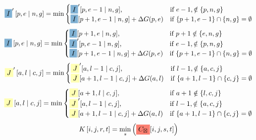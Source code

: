 \documentclass{article}
\begin{document}
$$ \colorbox{c4}{$I$}' \left[p,e \mid  n,g \right] =  \min\begin{cases}\colorbox{c4}{$I$}'[ p , e-1\mid n,g ], &\text{if } e-1 ,\notin\{ p , n,g \} \\\colorbox{c4}{$I$}[ p+1 , e-1\mid n,g ]+\Delta G(p,e) &\text{if } \{ p+1 , e-1 \}\cap \{ n,g \}=\emptyset\end{cases}$$
$$ \colorbox{c4}{$I$} \left[p,e \mid  n,g \right] =  \min\begin{cases}\colorbox{c4}{$I$}[ p+1 , e\mid n,g ], &\text{if } p+1 \notin\{ e , n,g \} \\\colorbox{c4}{$I$}'[ p , e-1\mid n,g ], &\text{if } e-1 ,\notin\{ p , n,g \} \\\colorbox{c4}{$I$}[ p+1 , e-1\mid n,g ]+\Delta G(p,e) &\text{if } \{ p+1 , e-1 \}\cap \{ n,g \}=\emptyset\end{cases}$$
$$ \colorbox{c1}{$J$}' \left[a,l \mid  c,j \right] =  \min\begin{cases}\colorbox{c1}{$J$}'[ a , l-1\mid c,j ], &\text{if } l-1 ,\notin\{ a , c,j \} \\\colorbox{c1}{$J$}[ a+1 , l-1\mid c,j ]+\Delta G(a,l) &\text{if } \{ a+1 , l-1 \}\cap \{ c,j \}=\emptyset\end{cases}$$
$$ \colorbox{c1}{$J$} \left[a,l \mid  c,j \right] =  \min\begin{cases}\colorbox{c1}{$J$}[ a+1 , l\mid c,j ], &\text{if } a+1 \notin\{ l , c,j \} \\\colorbox{c1}{$J$}'[ a , l-1\mid c,j ], &\text{if } l-1 ,\notin\{ a , c,j \} \\\colorbox{c1}{$J$}[ a+1 , l-1\mid c,j ]+\Delta G(a,l) &\text{if } \{ a+1 , l-1 \}\cap \{ c,j \}=\emptyset\end{cases}$$
$$ K\left[ i,j,r,t \right] =\min_{ s } \left( \colorbox{c3}{$C_{\boxtimes}$}[i,j,s,t]\right) $$
\end{document}
